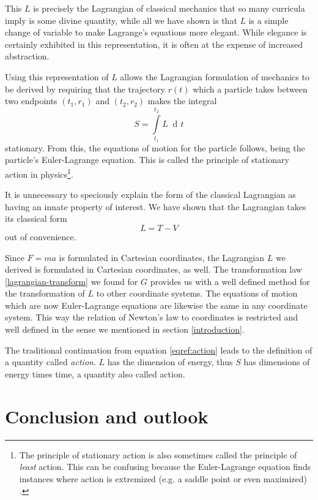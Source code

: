 \documentclass[prb,preprint]{revtex4-1}
\DeclareMathOperator{\dd}{d\!}
\begin{document}
This $L$ is precisely the Lagrangian of classical mechanics that so many curricula imply is some divine quantity, while all we have shown is that $L$ is a simple change of variable to make Lagrange's equations more elegant. While elegance is certainly exhibited in this representation, it is often at the expense of increased abstraction.

Using this representation of $L$ allows the Lagrangian formulation of mechanics to be derived by requiring that the trajectory $r(t)$ which a particle takes between two endpoints $(t_1,r_1)$ and $(t_2,r_2)$ makes the integral
\begin{equation}\label{eqref:action}
S=\int\limits_{t_1}^{t_2} L \; \dd t
\end{equation}
stationary. From this, the equations of motion for the particle follows, being the particle's Euler-Lagrange equation. This is called the principle of stationary action in physics\footnote{The principle of stationary action is also sometimes called the principle of \emph{least} action. This can be confusing because the Euler-Lagrange equation finds instances where action is extremized (e.g. a saddle point or even maximized) \cite{gray2007action}.}.

It is unnecessary to speciously explain the form of the classical Lagrangian as having an innate property of interest. We have shown that the Lagrangian takes its classical form
\begin{equation}
  L = T-V
\end{equation}
out of convenience.

Since $F=ma$ is formulated in Cartesian coordinates, the Lagrangian $L$ we derived is formulated in Cartesian coordinates, as well. The transformation law \ref{lagrangian-transform} we found for $G$ provides us with a well defined method for the transformation of $L$ to other coordinate systems. The equations of motion which are now Euler-Lagrange equations are likewise the same in any coordinate system.  This way the relation of Newton's law to coordinates is restricted and well defined in the sense we mentioned in section \ref{introduction}.

The traditional continuation from equation \eqref{eqref:action} leads to the definition of a quantity called \emph{action}. $L$ has the dimension of energy, thus $S$ has dimensions of energy times time, a quantity also called action.

\section{Conclusion and outlook}
\end{document}
